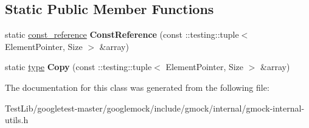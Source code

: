 \subsection*{Static Public Member Functions}
\begin{DoxyCompactItemize}
\item 
\mbox{\label{classtesting_1_1internal_1_1StlContainerView_3_01_1_1testing_1_1tuple_3_01ElementPointer_00_01Size_01_4_01_4_aba9be6fade312dd735ac47a3cb8cc355}} 
static \hyperlink{classtesting_1_1internal_1_1NativeArray}{const\+\_\+reference} {\bfseries Const\+Reference} (const \+::testing\+::tuple$<$ Element\+Pointer, Size $>$ \&array)
\item 
\mbox{\label{classtesting_1_1internal_1_1StlContainerView_3_01_1_1testing_1_1tuple_3_01ElementPointer_00_01Size_01_4_01_4_a3d42db21a2f88d407a4b5acbb7fe252c}} 
static \hyperlink{classtesting_1_1internal_1_1NativeArray}{type} {\bfseries Copy} (const \+::testing\+::tuple$<$ Element\+Pointer, Size $>$ \&array)
\end{DoxyCompactItemize}


The documentation for this class was generated from the following file\+:\begin{DoxyCompactItemize}
\item 
Test\+Lib/googletest-\/master/googlemock/include/gmock/internal/gmock-\/internal-\/utils.\+h\end{DoxyCompactItemize}
